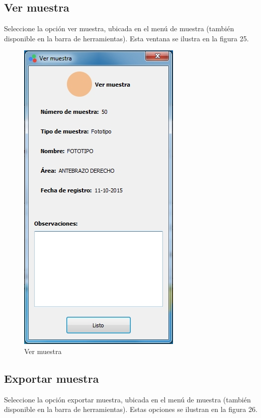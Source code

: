 	\subsection{Ver muestra}
	
	Seleccione la opci\'{o}n ver muestra, ubicada en el men\'{u} de muestra (tambi\'{e}n disponible en la barra de herramientas). Esta ventana se ilustra en la figura 25.
	
\begin{figure}[H]
  \centering
  \includegraphics[width=.5\linewidth]{./img/ver-muestra.jpg}
\caption{Ver muestra}
\end{figure}

	\subsection{Exportar muestra}
	
	Seleccione la opci\'{o}n exportar muestra, ubicada en el men\'{u} de muestra (tambi\'{e}n disponible en la barra de herramientas). Estas opciones se ilustran en la figura 26.
	
